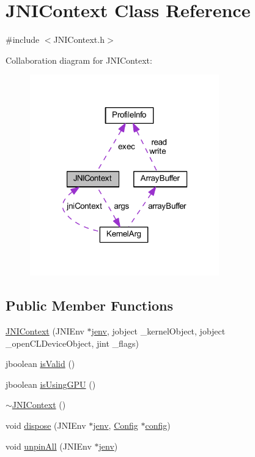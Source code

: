 \hypertarget{class_j_n_i_context}{\section{J\-N\-I\-Context Class Reference}
\label{class_j_n_i_context}
}


{\ttfamily \#include $<$J\-N\-I\-Context.\-h$>$}



Collaboration diagram for J\-N\-I\-Context\-:
\nopagebreak
\begin{figure}[H]
\begin{center}
\leavevmode
\includegraphics[width=232pt]{class_j_n_i_context__coll__graph}
\end{center}
\end{figure}
\subsection*{Public Member Functions}
\begin{DoxyCompactItemize}
\item 
\hyperlink{class_j_n_i_context_ae7bcb26fc659539d13b21a17e5522477}{J\-N\-I\-Context} (J\-N\-I\-Env $\ast$\hyperlink{aparapi_8cpp_a31595c73e9a3750524b2ff61b5a14f96}{jenv}, jobject \-\_\-kernel\-Object, jobject \-\_\-open\-C\-L\-Device\-Object, jint \-\_\-flags)
\item 
jboolean \hyperlink{class_j_n_i_context_a3d99cd3ef6a15a5f14d765e9c7f471ba}{is\-Valid} ()
\item 
jboolean \hyperlink{class_j_n_i_context_a007f2b45dc1812fc4e3b6c34994d33ec}{is\-Using\-G\-P\-U} ()
\item 
\hyperlink{class_j_n_i_context_adf5347ad76e5f447974741af8b407181}{$\sim$\-J\-N\-I\-Context} ()
\item 
void \hyperlink{class_j_n_i_context_ae0906906c3fe4d7b5c468724bf338903}{dispose} (J\-N\-I\-Env $\ast$\hyperlink{aparapi_8cpp_a31595c73e9a3750524b2ff61b5a14f96}{jenv}, \hyperlink{class_config}{Config} $\ast$\hyperlink{config_8h_a6a44a77efe9d36d03240f900d00dad80}{config})
\item 
void \hyperlink{class_j_n_i_context_a06ec119ce96e3c59c52159976203cbee}{unpin\-All} (J\-N\-I\-Env $\ast$\hyperlink{aparapi_8cpp_a31595c73e9a3750524b2ff61b5a14f96}{jenv})
\end{DoxyCompactItemize}

